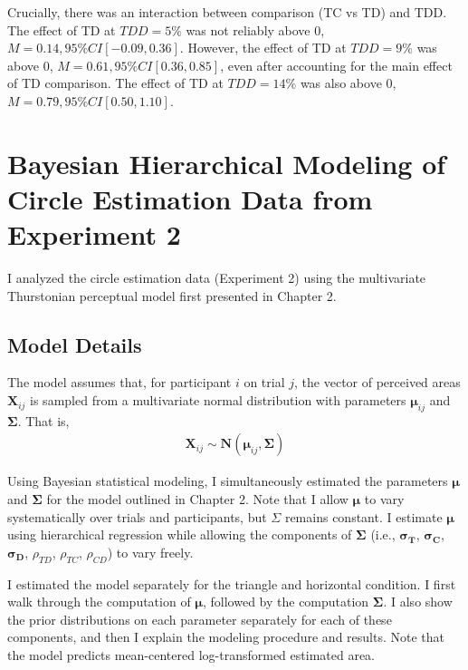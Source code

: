  Crucially, there was an interaction between comparison (TC vs TD) and TDD. The effect of TD at $TDD=5\%$ was not reliably above 0, $\textit{M}=0.14, 95\%CI [-0.09, 0.36]$. However, the effect of TD at $TDD=9\%$ was above 0, $\textit{M}=0.61, 95\%CI [0.36, 0.85]$, even after accounting for the main effect of TD comparison. The effect of TD at $TDD=14\%$ was also above 0, $\textit{M}=0.79, 95\%CI [0.50, 1.10]$.

\chapter{Bayesian Hierarchical Modeling of Circle Estimation Data from Experiment 2}

I analyzed the circle estimation data (Experiment 2) using the multivariate Thurstonian perceptual model first presented in Chapter 2. 

\section{Model Details}

The model assumes that, for participant $i$ on trial $j$, the vector of perceived areas $\boldsymbol{X}_{ij}$ is sampled from a multivariate normal distribution with parameters $\boldsymbol{\mu}_{ij}$ and $\boldsymbol{\Sigma}$. That is,
\begin{align}
    \boldsymbol{X}_{ij} \sim \mathcal{\textbf{N}}(\boldsymbol{\mu}_{ij},\boldsymbol{\Sigma})
\end{align}

Using Bayesian statistical modeling, I simultaneously estimated the parameters  $\boldsymbol{\mu}$ and $\boldsymbol{\Sigma}$ for the model outlined in Chapter 2. Note that I allow $\boldsymbol{\mu}$ to vary systematically over trials and participants, but $\Sigma$ remains constant. I estimate $\boldsymbol{\mu}$ using hierarchical regression while allowing the components of $\boldsymbol{\Sigma}$ (i.e., $\boldsymbol{\sigma_{T}}$, $\boldsymbol{\sigma_{C}}$, $\boldsymbol{\sigma_{D}}$, $\rho_{TD}$, $\rho_{TC}$, $\rho_{CD}$) to vary freely. 

I estimated the model separately for the triangle and horizontal condition. I first walk through the computation of $\boldsymbol{\mu}$, followed by the computation $\boldsymbol{\Sigma}$. I also show the prior distributions on each parameter separately for each of these components, and then I explain the modeling procedure and results. Note that the model predicts mean-centered log-transformed estimated area.

